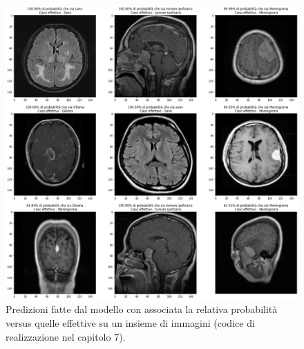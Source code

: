       \begin{figure}[H]
        \centering
        \includegraphics[width=1.1\textwidth]{Figures/brain-tumr-results.png}
        \caption{\small{Predizioni fatte dal modello con associata la relativa probabilità versus 
        quelle effettive su un insieme di immagini (codice di realizzazione nel capitolo 7).
        } %
        } %
        \label{fi:dcalc}
      \end{figure}
    \newpage

